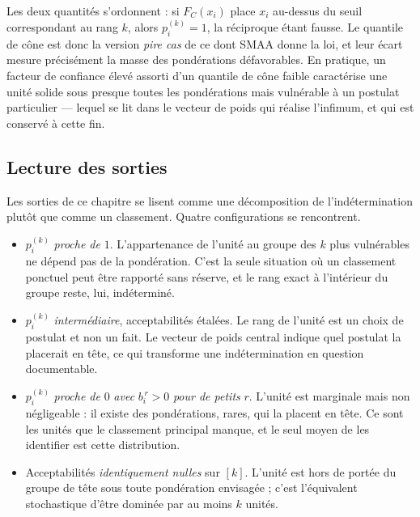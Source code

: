 \documentclass[11pt,a4paper]{article}
\theoremstyle{definition}
\theoremstyle{remark}
\begin{document}
\bigskip

Les deux quantités s'ordonnent : si $F_C(x_i)$ place $x_i$ au-dessus du seuil
correspondant au rang $k$, alors $p^{(k)}_i = 1$, la réciproque étant fausse. Le
quantile de cône est donc la version \emph{pire cas} de ce dont SMAA donne la loi, et
leur écart mesure précisément la masse des pondérations défavorables. En pratique, un
facteur de confiance élevé assorti d'un quantile de cône faible caractérise une unité
solide sous presque toutes les pondérations mais vulnérable à un postulat particulier ---
lequel se lit dans le vecteur de poids qui réalise l'infimum, et qui est conservé à cette
fin.

\bigskip

\subsection{Lecture des sorties}
\label{sec:smaa-lecture}

\medskip

Les sorties de ce chapitre se lisent comme une décomposition de l'indétermination plutôt
que comme un classement. Quatre configurations se rencontrent.

\medskip

\begin{itemize}[nosep,leftmargin=1.4em]
  \item $p^{(k)}_i$ \emph{proche de} $1$. L'appartenance de l'unité au groupe des $k$
  plus vulnérables ne dépend pas de la pondération. C'est la seule situation où un
  classement ponctuel peut être rapporté sans réserve, et le rang exact à l'intérieur du
  groupe reste, lui, indéterminé.
  \item $p^{(k)}_i$ \emph{intermédiaire}, acceptabilités étalées. Le rang de l'unité est
  un choix de postulat et non un fait. Le vecteur de poids central indique quel postulat
  la placerait en tête, ce qui transforme une indétermination en question documentable.
  \item $p^{(k)}_i$ \emph{proche de} $0$ \emph{avec} $b^{\,r}_i > 0$ \emph{pour de petits}
  $r$. L'unité est marginale mais non négligeable : il existe des pondérations, rares, qui
  la placent en tête. Ce sont les unités que le classement principal manque, et le seul
  moyen de les identifier est cette distribution.
  \item Acceptabilités \emph{identiquement nulles} sur $[k]$. L'unité est hors de portée
  du groupe de tête sous toute pondération envisagée ; c'est l'équivalent stochastique
  d'être dominée par au moins $k$ unités.
\end{itemize}
\end{document}
